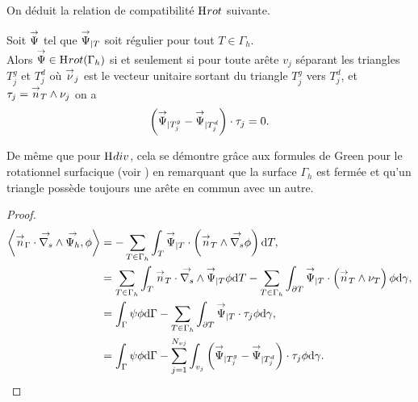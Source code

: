 On déduit la relation de compatibilité \(\mathrm{H}_\mathrm{{}}{rot}\) suivante.
\begin{prop}
    \label{prop:annex:hdiv_hrot:hrot}
    Soit \({\overset{\rightarrow}{\Psi}}\) tel que \({\overset{\rightarrow}{\Psi}}_{|T}\) soit régulier pour tout \(T\in\Gamma_h\).\\
    Alors \({\overset{\rightarrow}{\Psi}} \in \mathrm{H}_\mathrm{{}}{rot}(\Gamma_h)\) si et seulement si pour toute arête \(v_j\) séparant les triangles \(T_j^g\) et \(T_j^d\) où \({\overset{\rightarrow}{\nu}}_j\) est le vecteur unitaire sortant du triangle \(T_j^g\) vers \(T_j^d\), et \(\tau_j = {\overset{\rightarrow}{n}}_T \wedge \nu_j\) on a
    \begin{equation*}
        \left({\overset{\rightarrow}{\Psi}}_{|T_j^g} - {\overset{\rightarrow}{\Psi}}_{|T_j^d} \right) \cdot \tau_j = 0.
    \end{equation*}
\end{prop}

De même que pour \(\mathrm{H}_\mathrm{{}}{div}\), cela se démontre grâce aux formules de Green pour le rotationnel surfacique (voir \cite[eq.~(A3.57)]{bladel_electromagnetic_2007}) en remarquant que la surface \(\Gamma_h\) est fermée et qu'un triangle possède toujours une arête en commun avec un autre.

\begin{proof}
    \begin{align*}
    \left< {\overset{\rightarrow}{n}}_\Gamma \cdot {\overset{\rightarrow}{\nabla_s}} \wedge {\overset{\rightarrow}{\Psi_h}}, \phi \right>
    & = - \sum_{T\in\Gamma_h} \int_T {\overset{\rightarrow}{\Psi}}_{|T}  \cdot \left( {\overset{\rightarrow}{n}}_T \wedge {\overset{\rightarrow}{\nabla_s}} \phi \right) \mathrm{d}{T}, \\
    & = \sum_{T\in\Gamma_h} \int_T {\overset{\rightarrow}{n}}_T \cdot {\overset{\rightarrow}{\nabla_s}} \wedge {\overset{\rightarrow}{\Psi}}_{|T} \phi \mathrm{d}{T} - \sum_{T\in\Gamma_h} \int_{\partial T}  {\overset{\rightarrow}{\Psi}}_{|T} \cdot \left({\overset{\rightarrow}{n}}_T \wedge \nu_T \right)\phi\mathrm{d}{\gamma},\\
    & = \int_\Gamma \psi \phi \mathrm{d}{\Gamma} - \sum_{T\in\Gamma_h} \int_{\partial T}  {\overset{\rightarrow}{\Psi}}_{|T} \cdot \tau_j \phi\mathrm{d}{\gamma},\\
    &= \int_\Gamma \psi \phi \mathrm{d}{\Gamma} - \sum_{j=1}^{N_{vj}} \int_{v_j}  \left({\overset{\rightarrow}{\Psi}}_{|T_j^g} - {\overset{\rightarrow}{\Psi}}_{|T_j^d} \right) \cdot \tau_j \phi\mathrm{d}{\gamma}.
    \end{align*}
\end{proof}

